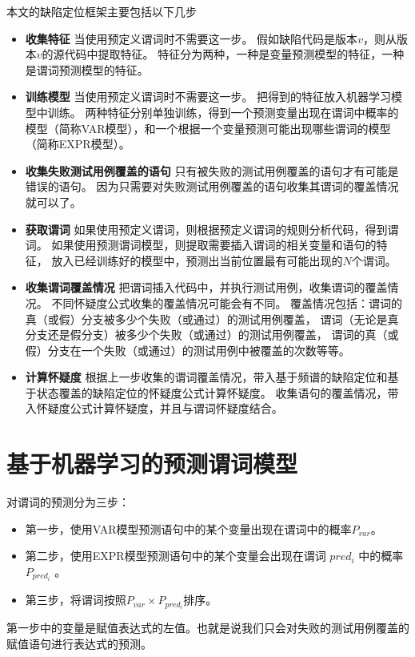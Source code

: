 本文的缺陷定位框架主要包括以下几步
\begin{itemize}
\item \textbf{收集特征} 
当使用预定义谓词时不需要这一步。
假如缺陷代码是版本$v$，则从版本$v$的源代码中提取特征。
特征分为两种，一种是变量预测模型的特征，一种是谓词预测模型的特征。
\item \textbf{训练模型}
当使用预定义谓词时不需要这一步。
把得到的特征放入机器学习模型中训练。
两种特征分别单独训练，得到一个预测变量出现在谓词中概率的模型（简称VAR模型），和一个根据一个变量预测可能出现哪些谓词的模型（简称EXPR模型）。
\item \textbf{收集失败测试用例覆盖的语句}
只有被失败的测试用例覆盖的语句才有可能是错误的语句。
因为只需要对失败测试用例覆盖的语句收集其谓词的覆盖情况就可以了。
\item \textbf{获取谓词}
如果使用预定义谓词，则根据预定义谓词的规则分析代码，得到谓词。
如果使用预测谓词模型，则提取需要插入谓词的相关变量和语句的特征，
放入已经训练好的模型中，预测出当前位置最有可能出现的$N$个谓词。
\item \textbf{收集谓词覆盖情况}
把谓词插入代码中，并执行测试用例，收集谓词的覆盖情况。
不同怀疑度公式收集的覆盖情况可能会有不同。
覆盖情况包括：谓词的真（或假）分支被多少个失败（或通过）的测试用例覆盖，
谓词（无论是真分支还是假分支）被多少个失败（或通过）的测试用例覆盖，
谓词的真（或假）分支在一个失败（或通过）的测试用例中被覆盖的次数等等。
\item \textbf{计算怀疑度}
根据上一步收集的谓词覆盖情况，带入基于频谱的缺陷定位和基于状态覆盖的缺陷定位的怀疑度公式计算怀疑度。
收集语句的覆盖情况，带入怀疑度公式计算怀疑度，并且与谓词怀疑度结合。
\end{itemize}

\section{基于机器学习的预测谓词模型}

对谓词的预测分为三步：
\begin{itemize}
\item 第一步，使用VAR模型预测语句中的某个变量出现在谓词中的概率$P_{var}$。
\item 第二步，使用EXPR模型预测语句中的某个变量会出现在谓词 $pred_i$ 中的概率 $P_{pred_i}$ 。
\item 第三步，将谓词按照$P_{var} \times P_{pred_i}$排序。
\end{itemize}

第一步中的变量是赋值表达式的左值。也就是说我们只会对失败的测试用例覆盖的赋值语句进行表达式的预测。

